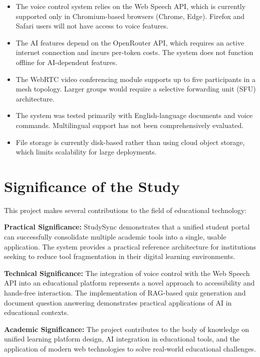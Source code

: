 \documentclass[12pt,a4paper]{report}
\begin{document}
\begin{itemize}
    \item The voice control system relies on the Web Speech API, which is currently supported only in Chromium-based browsers (Chrome, Edge). Firefox and Safari users will not have access to voice features.
    \item The AI features depend on the OpenRouter API, which requires an active internet connection and incurs per-token costs. The system does not function offline for AI-dependent features.
    \item The WebRTC video conferencing module supports up to five participants in a mesh topology. Larger groups would require a selective forwarding unit (SFU) architecture.
    \item The system was tested primarily with English-language documents and voice commands. Multilingual support has not been comprehensively evaluated.
    \item File storage is currently disk-based rather than using cloud object storage, which limits scalability for large deployments.
\end{itemize}

\section{Significance of the Study}

This project makes several contributions to the field of educational technology:

\textbf{Practical Significance:} StudySync demonstrates that a unified student portal can successfully consolidate multiple academic tools into a single, usable application. The system provides a practical reference architecture for institutions seeking to reduce tool fragmentation in their digital learning environments.

\textbf{Technical Significance:} The integration of voice control with the Web Speech API into an educational platform represents a novel approach to accessibility and hands-free interaction. The implementation of RAG-based quiz generation and document question answering demonstrates practical applications of AI in educational contexts.

\textbf{Academic Significance:} The project contributes to the body of knowledge on unified learning platform design, AI integration in educational tools, and the application of modern web technologies to solve real-world educational challenges.
\end{document}
